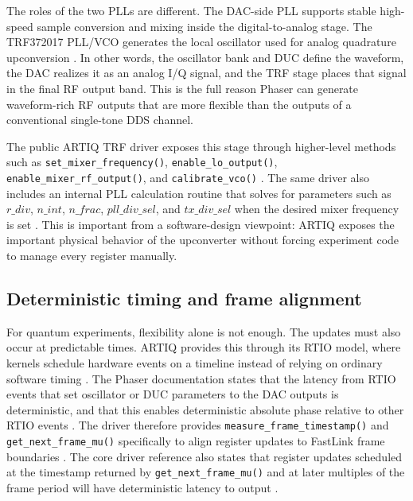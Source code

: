 The roles of the two PLLs are different. The DAC-side PLL supports stable high-speed sample conversion and mixing inside the digital-to-analog stage. The TRF372017 PLL/VCO generates the local oscillator used for analog quadrature upconversion \cite{dac34h84, trf372017}. In other words, the oscillator bank and DUC define the waveform, the DAC realizes it as an analog I/Q signal, and the TRF stage places that signal in the final RF output band. This is the full reason Phaser can generate waveform-rich RF outputs that are more flexible than the outputs of a conventional single-tone DDS channel.

The public ARTIQ TRF driver exposes this stage through higher-level methods such as \texttt{set\_mixer\_frequency()}, \texttt{enable\_lo\_output()}, \texttt{enable\_mixer\_rf\_output()}, and \texttt{calibrate\_vco()} \cite{artiq_trf_module}. The same driver also includes an internal PLL calculation routine that solves for parameters such as \(r\_div\), \(n\_int\), \(n\_frac\), \(pll\_div\_sel\), and \(tx\_div\_sel\) when the desired mixer frequency is set \cite{artiq_trf_module}. This is important from a software-design viewpoint: ARTIQ exposes the important physical behavior of the upconverter without forcing experiment code to manage every register manually.

\subsection{Deterministic timing and frame alignment}

For quantum experiments, flexibility alone is not enough. The updates must also occur at predictable times. ARTIQ provides this through its RTIO model, where kernels schedule hardware events on a timeline instead of relying on ordinary software timing \cite{artiq_rtio}. The Phaser documentation states that the latency from RTIO events that set oscillator or DUC parameters to the DAC outputs is deterministic, and that this enables deterministic absolute phase relative to other RTIO events \cite{artiq_phaser_module}. The driver therefore provides \texttt{measure\_frame\_timestamp()} and \texttt{get\_next\_frame\_mu()} specifically to align register updates to FastLink frame boundaries \cite{artiq_coredrivers, artiq_phaser_module}. The core driver reference also states that register updates scheduled at the timestamp returned by \texttt{get\_next\_frame\_mu()} and at later multiples of the frame period will have deterministic latency to output \cite{artiq_coredrivers}.

